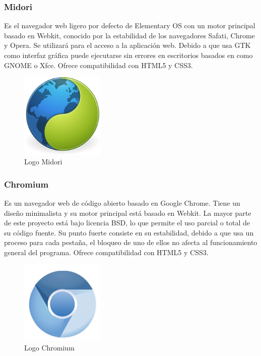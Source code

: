 		\subsubsection{Midori}
		Es el navegador web ligero por defecto de Elementary OS con un motor principal basado en Webkit, conocido por la estabilidad de los navegadores Safati, Chrome y Opera. Se utilizará para el acceso a la aplicación web. Debido a que usa \ac{GTK} como interfaz gráfica puede ejecutarse sin errores en escritorios basados en  como \ac{GNOME} o Xfce.
		Ofrece compatibilidad con HTML5 y CSS3.
		
		\begin{figure}[H]
		\centering
		\includegraphics[width=40mm, fbox={\fboxrule} 4mm]{images/04-metodo/30-midori_logo.png}
		\caption{Logo Midori}
		\label{fig:midori-logo}
		\end{figure}
		
		\subsubsection{Chromium}
		Es un navegador web de código abierto basado en Google Chrome.
		Tiene un diseño minimalista y su motor principal está basado en Webkit. La mayor parte de este proyecto está bajo licencia BSD, lo que permite el uso parcial o total de su código fuente. Su punto fuerte consiste en su estabilidad, debido a que usa un proceso para cada pestaña, el bloqueo de uno de ellos no afecta al funcionamiento general del programa.
		Ofrece compatibilidad con HTML5 y CSS3.
		
		\begin{figure}[H]
		\centering
		\includegraphics[width=40mm, fbox={\fboxrule} 4mm]{images/04-metodo/39-chromium_logo.png}
		\caption{Logo Chromium}
		\label{fig:chromium-logo}
		\end{figure}
		
